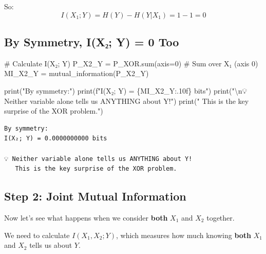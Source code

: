 \documentclass[
  11pt,
  letterpaper,
  oneside,
  openany]{book}
\newenvironment{Shaded}{\begin{snugshade}}{\end{snugshade}}
\newcommand{\BuiltInTok}[1]{\textcolor[rgb]{0.00,0.23,0.31}{#1}}
\newcommand{\CharTok}[1]{\textcolor[rgb]{0.13,0.47,0.30}{#1}}
\newcommand{\CommentTok}[1]{\textcolor[rgb]{0.37,0.37,0.37}{#1}}
\newcommand{\DecValTok}[1]{\textcolor[rgb]{0.68,0.00,0.00}{#1}}
\newcommand{\NormalTok}[1]{\textcolor[rgb]{0.00,0.23,0.31}{#1}}
\newcommand{\OperatorTok}[1]{\textcolor[rgb]{0.37,0.37,0.37}{#1}}
\newcommand{\SpecialCharTok}[1]{\textcolor[rgb]{0.37,0.37,0.37}{#1}}
\newcommand{\SpecialStringTok}[1]{\textcolor[rgb]{0.13,0.47,0.30}{#1}}
\newcommand{\StringTok}[1]{\textcolor[rgb]{0.13,0.47,0.30}{#1}}
\begin{document}
So: \[I(X_1; Y) = H(Y) - H(Y|X_1) = 1 - 1 = 0\]

\subsection{By Symmetry, I(X₂; Y) = 0
Too}\label{by-symmetry-ixux2082-y-0-too}

\begin{Shaded}
\begin{Highlighting}[]
\CommentTok{\# Calculate I(X₂; Y)}
\NormalTok{P\_X2\_Y }\OperatorTok{=}\NormalTok{ P\_XOR.}\BuiltInTok{sum}\NormalTok{(axis}\OperatorTok{=}\DecValTok{0}\NormalTok{)  }\CommentTok{\# Sum over X₁ (axis 0)}
\NormalTok{MI\_X2\_Y }\OperatorTok{=}\NormalTok{ mutual\_information(P\_X2\_Y)}

\BuiltInTok{print}\NormalTok{(}\StringTok{"By symmetry:"}\NormalTok{)}
\BuiltInTok{print}\NormalTok{(}\SpecialStringTok{f"I(X₂; Y) = }\SpecialCharTok{\{}\NormalTok{MI\_X2\_Y}\SpecialCharTok{:.10f\}}\SpecialStringTok{ bits"}\NormalTok{)}
\BuiltInTok{print}\NormalTok{(}\StringTok{"}\CharTok{\textbackslash{}n}\StringTok{💡 Neither variable alone tells us ANYTHING about Y!"}\NormalTok{)}
\BuiltInTok{print}\NormalTok{(}\StringTok{"   This is the key surprise of the XOR problem."}\NormalTok{)}
\end{Highlighting}
\end{Shaded}

\begin{verbatim}
By symmetry:
I(X₂; Y) = 0.0000000000 bits

💡 Neither variable alone tells us ANYTHING about Y!
   This is the key surprise of the XOR problem.
\end{verbatim}

\subsection{Step 2: Joint Mutual
Information}\label{step-2-joint-mutual-information}

Now let's see what happens when we consider \textbf{both} \(X_1\) and
\(X_2\) together.

We need to calculate \(I(X_1, X_2; Y)\), which measures how much knowing
\textbf{both} \(X_1\) and \(X_2\) tells us about \(Y\).
\end{document}
